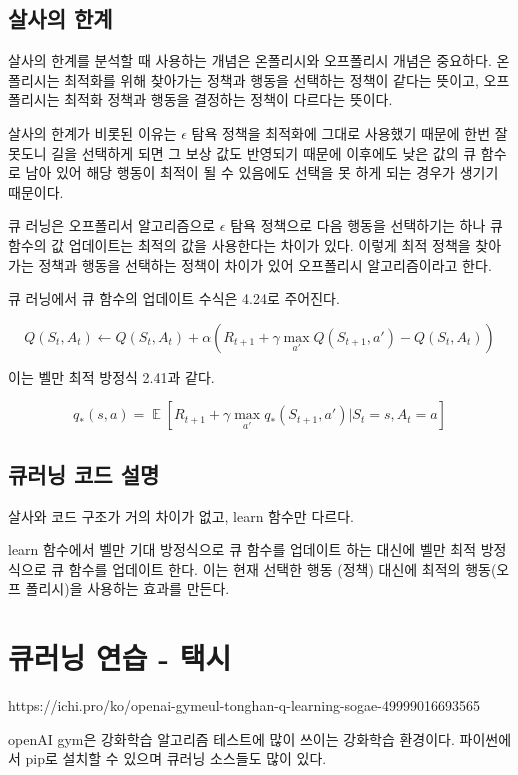 \documentclass[ %
    a4paper,    %
    amsmath,    %
    itemph,     %
]{oblivoir}     %
\DeclareMathOperator{\E}{\mathbb{E}}
\begin{document}
\subsection{살사의 한계}

살사의 한계를 분석할 때 사용하는 개념은 온폴리시와 오프폴리시 개념은 중요하다. 
온폴리시는 최적화를 위해 찾아가는 정책과 행동을 선택하는 정책이 같다는 뜻이고, 
오프폴리시는 최적화 정책과 행동을 결정하는 정책이 다르다는 뜻이다. 

살사의 한계가 비롯된 이유는 $\epsilon$ 탐욕 정책을 최적화에 그대로 사용했기 
때문에 한번 잘못도니 길을 선택하게 되면 그 보상 값도 반영되기 때문에 
이후에도 낮은 값의 큐 함수로 남아 있어 해당 행동이 최적이 될 수 있음에도 
선택을 못 하게 되는 경우가 생기기 때문이다. 

큐 러닝은 오프폴리서 알고리즘으로 $\epsilon$ 탐욕 정책으로 다음 행동을 
선택하기는 하나 큐 함수의 값 업데이트는 최적의 값을 사용한다는 차이가 있다. 
이렇게 최적 정책을 찾아가는 정책과 행동을 선택하는 정책이 차이가 있어 
오프폴리시 알고리즘이라고 한다. 

큐 러닝에서 큐 함수의 업데이트 수식은 4.24로 주어진다. 

$$
Q(S_t, A_t) \leftarrow Q(S_t, A_t) + \alpha(R_{t+1} + \gamma \max_{a'} Q(S_{t+1}, a') - Q(S_t, A_t))
$$

이는 벨만 최적 방정식 2.41과 같다. 

$$
q_*(s, a) = \E[R_{t+1} + \gamma \max_{a'} q_*(S_{t+1}, a') | S_t = s, A_t = a]
$$

\subsection{큐러닝 코드 설명}

살사와 코드 구조가 거의 차이가 없고, learn 함수만 다르다. 

learn 함수에서 벨만 기대 방정식으로 큐 함수를 업데이트 하는 대신에 
벨만 최적 방정식으로 큐 함수를 업데이트 한다. 이는 현재 선택한 
행동 (정책) 대신에 최적의 행동(오프 폴리시)을 사용하는 효과를 만든다. 

\section{큐러닝 연습 - 택시}

https://ichi.pro/ko/openai-gymeul-tonghan-q-learning-sogae-49999016693565

openAI gym은 강화학습 알고리즘 테스트에 많이 쓰이는 강화학습 환경이다. 
파이썬에서 pip로 설치할 수 있으며 큐러닝 소스들도 많이 있다. 
\end{document}
